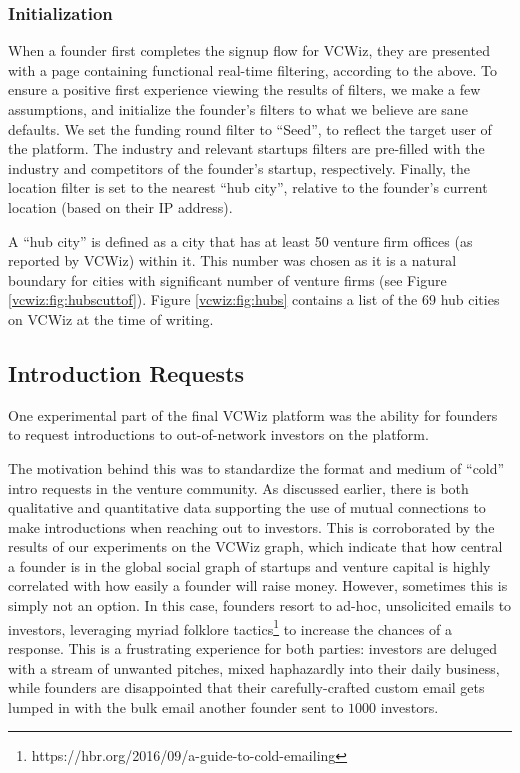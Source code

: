 \subsubsection{Initialization}

When a founder first completes the signup flow for VCWiz, they are presented with a page containing functional real-time filtering, according to the above. To ensure a positive first experience viewing the results of filters, we make a few assumptions, and initialize the founder's filters to what we believe are sane defaults. We set the funding round filter to ``Seed'', to reflect the target user of the platform. The industry and relevant startups filters are pre-filled with the industry and competitors of the founder's startup, respectively. Finally, the location filter is set to the nearest ``hub city'', relative to the founder's current location (based on their IP address).

A ``hub city'' is defined as a city that has at least 50 venture firm offices (as reported by VCWiz) within it. This number was chosen as it is a natural boundary for cities with significant number of venture firms (see Figure \ref{vcwiz:fig:hubscuttof}). Figure \ref{vcwiz:fig:hubs} contains a list of the 69 hub cities on VCWiz at the time of writing.

\subsection{Introduction Requests}
\label{chap4:introrequests}

One experimental part of the final VCWiz platform was the ability for founders to request introductions to out-of-network investors on the platform.

The motivation behind this was to standardize the format and medium of ``cold'' intro requests in the venture community. As discussed earlier, there is both qualitative and quantitative data supporting the use of mutual connections to make introductions when reaching out to investors. This is corroborated by the results of our experiments on the VCWiz graph, which indicate that how central a founder is in the global social graph of startups and venture capital is highly correlated with how easily a founder will raise money. However, sometimes this is simply not an option. In this case, founders resort to ad-hoc, unsolicited emails to investors, leveraging myriad folklore tactics\footnote{https://hbr.org/2016/09/a-guide-to-cold-emailing} to increase the chances of a response. This is a frustrating experience for both parties: investors are deluged with a stream of unwanted pitches, mixed haphazardly into their daily business, while founders are disappointed that their carefully-crafted custom email gets lumped in with the bulk email another founder sent to $1000$ investors.

